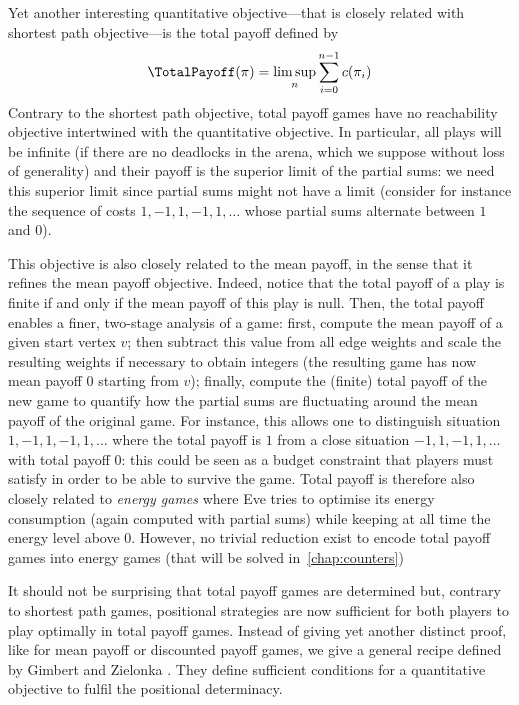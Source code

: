 Yet another interesting quantitative objective---that is closely
related with shortest path objective---is the total payoff defined by
\[\TotalPayoff(\pi)=\limsup_{n} \sum_{i=0}^{n-1} c(\pi_i)\]
Contrary to the shortest path objective, total payoff games have no
reachability objective intertwined with the quantitative objective. In
particular, all plays will be infinite (if there are no deadlocks in
the arena, which we suppose without loss of generality) and their
payoff is the superior limit of the partial sums: we need this
superior limit since partial sums might not have a limit (consider for
instance the sequence of costs $1,-1,1,-1,1,\ldots$ whose partial sums
alternate between $1$ and $0$).

This objective is also closely related to the mean payoff, in the
sense that it refines the mean payoff objective. Indeed, notice that
the total payoff of a play is finite if and only if the mean payoff of
this play is null. Then, the total payoff enables a finer, two-stage
analysis of a game: first, compute the mean payoff of a given start
vertex $v$; then subtract this value from all edge weights and scale
the resulting weights if necessary to obtain integers (the resulting
game has now mean payoff 0 starting from $v$); finally, compute the
(finite) total payoff of the new game to quantify how the partial sums
are fluctuating around the mean payoff of the original game. For
instance, this allows one to distinguish situation
$1,-1,1,-1,1,\ldots$ where the total payoff is $1$ from a close
situation $-1,1,-1,1,\ldots$ with total payoff $0$: this could be seen
as a budget constraint that players must satisfy in order to be able
to survive the game. Total payoff is therefore also closely related to
\emph{energy games} where Eve tries to optimise its energy consumption
(again computed with partial sums) while keeping at all time the
energy level above $0$. However, no trivial reduction exist to encode
total payoff games into energy games (that will be solved
in~\cref{chap:counters})

It should not be surprising that total payoff games are determined
but, contrary to shortest path games, positional strategies are now
sufficient for both players to play optimally in total payoff
games. Instead of giving yet another distinct proof, like for
mean payoff or discounted payoff games, we give a general recipe
defined by Gimbert and Zielonka \cite{Gimbert&Zielonka:2004}. They define
sufficient conditions for a quantitative objective to fulfil the
positional determinacy.

